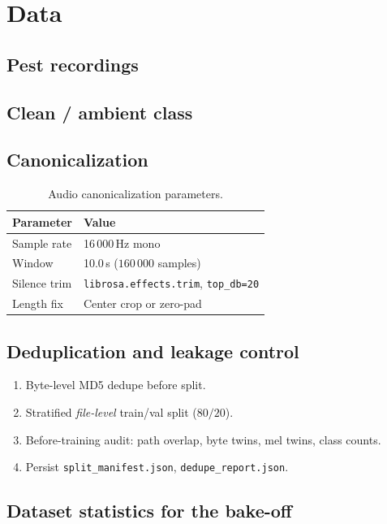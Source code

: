 \section{Data}
\label{sec:data}

\subsection{Pest recordings}

\subsection{Clean / ambient class}

\subsection{Canonicalization}
\begin{table}[H]
\centering
\caption{Audio canonicalization parameters.}
\label{tab:audio}
\begin{tabular}{@{}ll@{}}
\toprule
Parameter & Value \\
\midrule
Sample rate & 16\,000\,Hz mono \\
Window & 10.0\,s ($160\,000$ samples) \\
Silence trim & \texttt{librosa.effects.trim}, \texttt{top\_db=20} \\
Length fix & Center crop or zero-pad \\
\bottomrule
\end{tabular}
\end{table}

\subsection{Deduplication and leakage control}
\begin{enumerate}[leftmargin=*]
  \item Byte-level MD5 dedupe before split.
  \item Stratified \emph{file-level} train/val split ($80/20$).
  \item Before-training audit: path overlap, byte twins, mel twins, class counts.
  \item Persist \texttt{split\_manifest.json}, \texttt{dedupe\_report.json}.
\end{enumerate}

\subsection{Dataset statistics for the bake-off}
